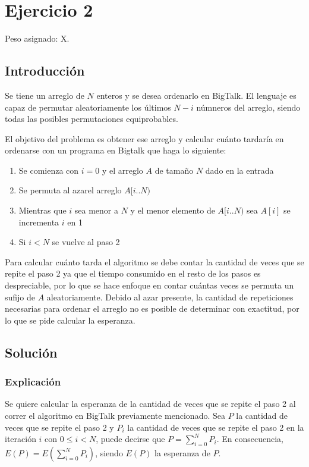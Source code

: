 \section{Ejercicio 2}

Peso asignado: X.

\subsection{Introducción}

Se tiene un arreglo de $N$ enteros y se desea ordenarlo en BigTalk. El
lenguaje es capaz de permutar aleatoriamente los últimos $N - i$ númneros del
arreglo, siendo todas las posibles permutaciones equiprobables.

El objetivo del problema es obtener ese arreglo y calcular cuánto tardaría en
ordenarse con un programa en Bigtalk que haga lo siguiente:

\begin{enumerate}
\item Se comienza con $i = 0$ y el arreglo $A$ de tamaño $N$ dado en la
entrada
\item Se permuta al azarel arreglo $A[i..N)$
\item Mientras que $i$ sea menor a $N$ y el menor elemento de $A[i..N)$ sea
$A[i]$ se incrementa $i$ en 1
\item Si $i < N$ se vuelve al paso 2
\end{enumerate}

Para calcular cuánto tarda el algoritmo se debe contar la cantidad de veces
que se repite el paso 2 ya que el tiempo consumido en el resto de los pasos es
despreciable, por lo que se hace enfoque en contar cuántas veces se permuta un
sufijo de $A$ aleatoriamente. Debido al azar presente, la cantidad de
repeticiones necesarias para ordenar el arreglo no es posible de determinar
con exactitud, por lo que se pide calcular la esperanza.

\subsection{Solución}

\subsubsection{Explicación}

Se quiere calcular la esperanza de la cantidad de veces que se repite el paso
2 al correr el algoritmo en BigTalk previamente mencionado. Sea $P$ la
cantidad de veces que se repite el paso 2 y $P_i$ la cantidad de veces que se
repite el paso 2 en la iteración $i$ con $0 \leq i < N$, puede decirse que
$P = \sum_{i = 0}^{N}{P_i}$. En consecuencia,
$E(P) = E(\sum_{i = 0}^{N}{P_i})$, siendo $E(P)$ la esperanza de $P$.

